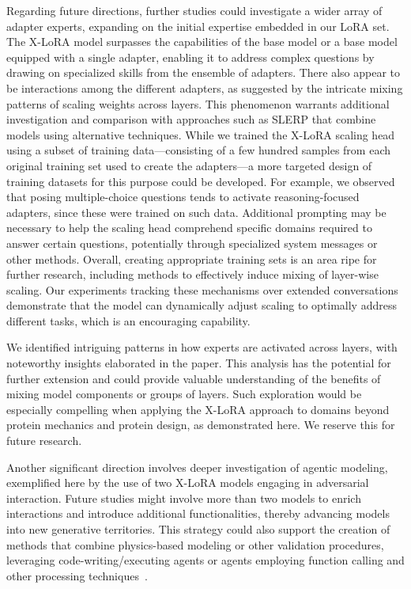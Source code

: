 Regarding future directions, further studies could investigate a wider array of adapter experts, expanding on the initial expertise embedded in our LoRA set. The X-LoRA model surpasses the capabilities of the base model or a base model equipped with a single adapter, enabling it to address complex questions by drawing on specialized skills from the ensemble of adapters. There also appear to be interactions among the different adapters, as suggested by the intricate mixing patterns of scaling weights across layers. This phenomenon warrants additional investigation and comparison with approaches such as SLERP that combine models using alternative techniques. While we trained the X-LoRA scaling head using a subset of training data—consisting of a few hundred samples from each original training set used to create the adapters—a more targeted design of training datasets for this purpose could be developed. For example, we observed that posing multiple-choice questions tends to activate reasoning-focused adapters, since these were trained on such data. Additional prompting may be necessary to help the scaling head comprehend specific domains required to answer certain questions, potentially through specialized system messages or other methods. Overall, creating appropriate training sets is an area ripe for further research, including methods to effectively induce mixing of layer-wise scaling. Our experiments tracking these mechanisms over extended conversations demonstrate that the model can dynamically adjust scaling to optimally address different tasks, which is an encouraging capability.

We identified intriguing patterns in how experts are activated across layers, with noteworthy insights elaborated in the paper. This analysis has the potential for further extension and could provide valuable understanding of the benefits of mixing model components or groups of layers. Such exploration would be especially compelling when applying the X-LoRA approach to domains beyond protein mechanics and protein design, as demonstrated here. We reserve this for future research.

Another significant direction involves deeper investigation of agentic modeling, exemplified here by the use of two X-LoRA models engaging in adversarial interaction. Future studies might involve more than two models to enrich interactions and introduce additional functionalities, thereby advancing models into new generative territories. This strategy could also support the creation of methods that combine physics-based modeling or other validation procedures, leveraging code-writing/executing agents or agents employing function calling and other processing techniques~\cite{Ghafarollahi2024ProtAgents:Learning}.

